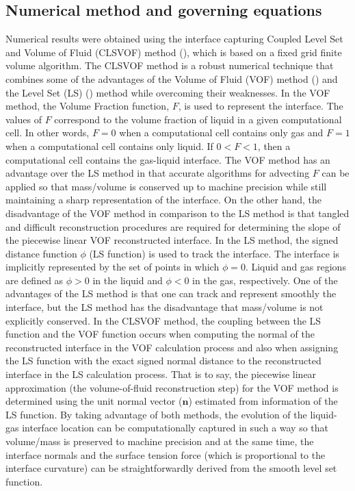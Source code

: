 \documentclass{elsarticle}
\begin{document}
\subsection{Numerical method and governing equations}
Numerical results were obtained using the interface capturing Coupled Level Set and Volume of Fluid (CLSVOF) method (\citet{SusPuc00,SusSmiHusOhtZhi07}), which is based on a fixed grid finite volume algorithm.  The CLSVOF method is a robust  numerical  technique that  combines  some  of  the  advantages  of the Volume of Fluid (VOF) method (\citet{HirNic81}) and the Level Set (LS) (\citet{SusSmeOsh94}) method while overcoming their weaknesses.  In the VOF method,  the Volume Fraction function, $F$, is used to represent the interface. The values of $F$ correspond to the volume fraction of liquid in a given computational cell.  In other words, $F = 0$ when a computational cell contains only gas and $F = 1$ when a computational cell contains only liquid.  If $0 < F < 1$, then a computational cell contains the gas-liquid interface. The VOF method has an advantage over the LS method in that accurate algorithms for advecting $F$ can be applied so that mass/volume is conserved up to machine precision while still maintaining a sharp representation of the interface.  On the other hand, the disadvantage of the VOF method in comparison to the LS method is that tangled and difficult reconstruction procedures are required for determining the slope of the piecewise linear VOF reconstructed interface.  In the LS method, the signed distance function $\phi$ (LS function) is used to track the interface. The interface is implicitly represented by the set of points in which $\phi = 0$.  Liquid and gas regions are defined as $\phi > 0$ in the liquid and $\phi < 0$ in the gas, respectively.  One of the advantages of the LS method is that one can track and represent smoothly the interface, but the LS method has the disadvantage that mass/volume is not explicitly conserved.  In the CLSVOF method, the coupling between the LS function and the VOF function occurs when computing the normal of the reconstructed interface in the VOF calculation process and also when assigning the LS function with the exact signed normal distance to the reconstructed interface in the LS calculation process. That is to say, the piecewise linear approximation (the volume-of-fluid reconstruction step) for the VOF method is determined using the unit normal vector ($\bm n$) estimated from information of the LS function. By taking advantage of both methods, the evolution of the liquid-gas interface location can be computationally captured in such a way so that volume/mass is preserved to machine precision and at the same time, the interface normals and the surface tension force (which is proportional to the interface curvature) can be straightforwardly derived from the smooth level set function.
\end{document}
